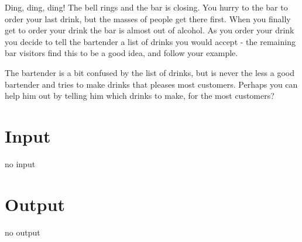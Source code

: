 

\noindent Ding, ding, ding! The bell rings and the bar is closing. 
You hurry to the bar to order your last drink, but the masses of people get there first. 
When you finally get to order your drink the bar is almost out of alcohol. 
As you order your drink you decide to tell the bartender a list of drinks you would accept - the remaining bar visitors find this to be a good idea, and follow your example.

The bartender is a bit confused by the list of drinks, but is never the less a good bartender and tries to make drinks that pleases most customers.
Perhaps you can help him out by telling him which drinks to make, for the most customers?

\section*{Input}
no input

\section*{Output}
no output